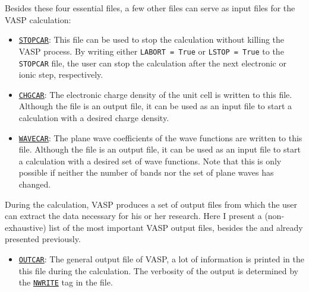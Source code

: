\begin{refsection}
\begin{itemize}
\end{itemize}

Besides these four essential files, a few other files can serve as input files 
for the \gls{VASP} calculation:

\begin{itemize}

 \label{appendix:sec-STOPCAR} 
\item \href{https://www.vasp.at/wiki/index.php/STOPCAR}{\texttt{STOPCAR}}:
This file can be used to stop the calculation without killing the \gls{VASP} 
process. By writing either \texttt{LABORT = True} or \texttt{LSTOP = True} to 
the \texttt{STOPCAR} file, the user can stop the calculation after the next 
electronic or ionic step, respectively.

 \label{appendix:sec-CHGCAR} 
\item \href{https://www.vasp.at/wiki/index.php/CHGCAR}{\texttt{CHGCAR}}: 
The electronic charge density of the unit cell is written to this file. 
Although the file is an output file, it can be used as an input file to 
start a calculation with a desired charge density.

 \label{appendix:sec-WAVECAR} 
\item \href{https://www.vasp.at/wiki/index.php/WAVECAR}{\texttt{WAVECAR}}: 
The plane wave coefficients of the wave functions are written to this file. 
Although the file is an output file, it can be used as an input file to 
start a calculation with a desired set of wave functions. Note that this 
is only possible if neither the number of bands nor the set of plane waves 
has changed.

\end{itemize} 

During the calculation, \gls{VASP} produces a set of output files from which the 
user can extract the data necessary for his or her research. Here I present a  
(non-exhaustive) list of the most important \gls{VASP} output files, besides the 
 and  already presented previously.
 
\begin{itemize} 
 
 \label{appendix:sec-OUTCAR} 
\item \href{https://www.vasp.at/wiki/index.php/OUTCAR}{\texttt{OUTCAR}}: 
The general output file of \gls{VASP}, a lot of information is printed in the this 
file during the calculation. The verbosity of the output is determined by the 
\href{https://www.vasp.at/wiki/index.php/NWRITE}{\texttt{NWRITE}} tag in the 
 file. 


\end{itemize}
\end{refsection}

